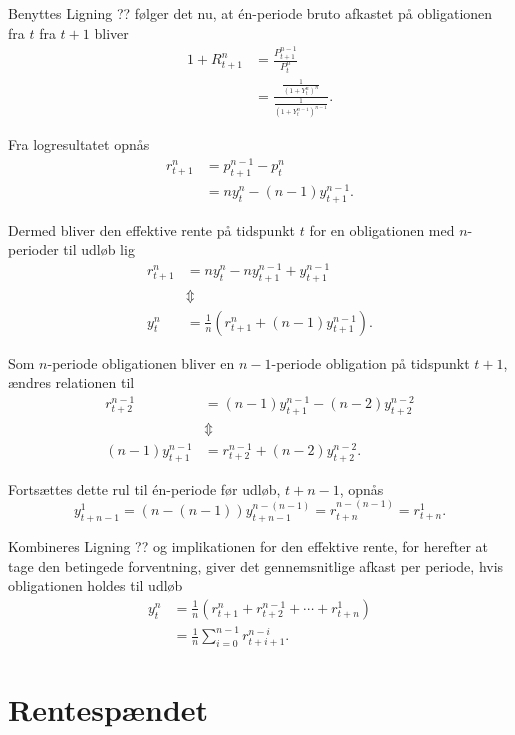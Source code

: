 \documentclass[
  a4paper,
  oneside]{memoir}
\begin{document}
Benyttes Ligning ?? følger det nu, at én-periode bruto afkastet på obligationen fra \(t\) fra \(t+1\) bliver
\begin{align}
1+R_{t+1}^n&=\frac{P_{t+1}^{n-1}}{P_t^n}\\
&=\frac{\frac{1}{\left(1+Y_t^n\right)^n}}{\frac{1}{\left(1+Y_t^{n-1}\right)^{n-1}}}.
\end{align}

Fra logresultatet opnås
\begin{align}
r_{t+1}^n&=p_{t+1}^{n-1}-p_t^n\\
&=n y_t^n - \left(n-1\right) y_{t+1}^{n-1}.
\end{align}

Dermed bliver den effektive rente på tidspunkt \(t\) for en obligationen med \(n\)-perioder til udløb lig
\begin{align}
r_{t+1}^n&=n y_t^n - ny_{t+1}^{n-1}+y_{t+1}^{n-1}\\
&\Updownarrow\\
y_t^n &=\frac{1}{n}\left( r_{t+1}^n + (n-1) y_{t+1}^{n-1} \right).
\end{align}

Som \(n\)-periode obligationen bliver en \(n-1\)-periode obligation på tidspunkt \(t+1\), ændres relationen til
\begin{align}
r_{t+2}^{n-1}&=\left(n-1\right) y_{t+1}^{n-1} - \left(n-2\right) y_{t+2}^{n-2}\\
&\Updownarrow\\
\left(n-1\right) y_{t+1}^{n-1}&=r_{t+2}^{n-1} + \left(n-2\right) y_{t+2}^{n-2}.
\end{align}

Fortsættes dette rul til én-periode før udløb, \(t+n-1\), opnås
\begin{equation}
y_{t+n-1}^{1}=\left(n-\left(n-1\right)\right)y_{t+n-1}^{n-\left(n-1\right)}=r_{t+n}^{n-\left(n-1\right)}=r_{t+n}^1.
\end{equation}

Kombineres Ligning ?? og implikationen for den effektive rente, for herefter at tage den betingede forventning, giver det gennemsnitlige afkast per periode, hvis obligationen holdes til udløb
\begin{align}
y_t^n&=\frac{1}{n} \left(r_{t+1}^n + r_{t+2}^{n-1}+\cdots+r_{t+n}^1\right)\\
&=\frac{1}{n}\sum_{i=0}^{n-1} r_{t+i+1}^{n-i}.
\end{align}

\hypertarget{rentespuxe6ndet}{%
\section{Rentespændet}\label{rentespuxe6ndet}}
\end{document}
